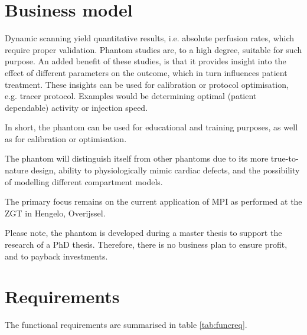 \section{Business model}
\label{sec:bus_model}
Dynamic scanning yield quantitative results, i.e. absolute perfusion rates, which require proper validation. Phantom studies are, to a high degree, suitable for such purpose. An added benefit of these studies, is that it provides insight into the effect of different parameters on the outcome, which in turn influences patient treatment. These insights can be used for calibration or protocol optimisation, e.g. tracer protocol. Examples would be determining optimal (patient dependable) activity or injection speed.

In short, the phantom can be used for educational and training purposes, as well as for calibration or optimisation. 

The phantom will distinguish itself from other phantoms due to its more true-to-nature design, ability to physiologically mimic cardiac defects, and the possibility of modelling different compartment models.

The primary focus remains on the current application of \ac{MPI} as performed at the ZGT in Hengelo, Overijssel.

Please note, the phantom is developed during a master thesis to support the research of a PhD thesis. Therefore, there is no business plan to ensure profit, and to payback investments.

\section{Requirements}
The functional requirements are summarised in table \ref{tab:funcreq}.

